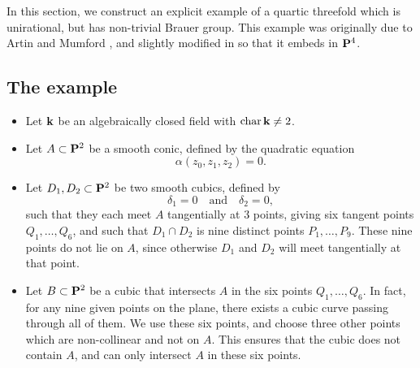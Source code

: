 In this section, we construct an explicit example
of a quartic threefold which is unirational,
but has non-trivial Brauer group.
This example was originally due to Artin and Mumford \cite{artin-mumford},
and slightly modified in \cite{CTP} so that it embeds in $\bbP^4$.

\subsection{The example} \label{sect-4}

\begin{itemize}
    \item
        Let $\bbk$ be an algebraically closed field with $\Char \bbk \neq 2$.
    \item 
        Let $A \subset \bbP^2$ be a smooth conic,
        defined by the quadratic equation 
        \[ \alpha (z_0, z_1, z_2) = 0. \]
    \item
        Let $D_1, D_2 \subset \bbP^2$ be two smooth cubics, defined by
        \[ \delta_1 = 0 \quad \text{and} \quad \delta_2 = 0, \]
        such that they each meet $A$ tangentially at $3$ points,
        giving six tangent points $Q_1, \dotsc, Q_6$,
        and such that $D_1 \cap D_2$ is nine distinct points $P_1, \dotsc, P_9$.
        These nine points do not lie on $A$, since otherwise $D_1$ and $D_2$ will meet tangentially at that point.
    \item
        Let $B \subset \bbP^2$ be a cubic that intersects $A$ in the six points $Q_1, \dotsc, Q_6$.
        In fact, for any nine given points on the plane, there exists a cubic curve passing through all of them.
        We use these six points, and choose three other points which are non-collinear and not on $A$.
        This ensures that the cubic does not contain $A$, and can only intersect $A$ in these six points.


\end{itemize}
